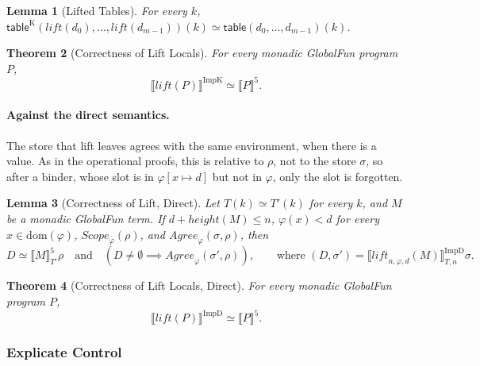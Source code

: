 \documentclass[10pt]{article}
\theoremstyle{acmplain}
\newtheorem{theorem}{Theorem}[section]
\newtheorem{lemma}[theorem]{Lemma}
\newcommand{\SEM}[1]{\llbracket #1 \rrbracket}
\newcommand{\key}[1]{\mathsf{#1}}
\newcommand{\pass}[1]{\mathit{#1}}
\newcommand{\NE}{\neq\emptyset}
\begin{document}
\begin{lemma}[Lifted Tables]\label{lem:lift-table}
For every $k$,
$\key{table}^{\mathrm{K}}(\pass{lift}(d_0), \ldots, \pass{lift}(d_{m-1}))(k) \simeq \key{table}(d_0, \ldots, d_{m-1})(k)$.
\end{lemma}

\begin{theorem}[Correctness of Lift Locals]\label{thm:lift}
For every monadic GlobalFun program $P$,
\[
  \SEM{\pass{lift}(P)}^{\mathrm{ImpK}} \simeq \SEM{P}^{\mathrm{5}} .
\]
\end{theorem}

\paragraph{Against the direct semantics.}
The store that lift leaves agrees with the same environment, when there
is a value. As in the operational proofs, this is relative to $\rho$,
not to the store $\sigma$, so after a binder, whose slot is in
$\varphi[x \mapsto d]$ but not in $\varphi$, only the slot is forgotten.

\begin{lemma}[Correctness of Lift, Direct]\label{lem:lift-sem-d}
Let $T(k) \simeq T'(k)$ for every $k$, and $M$ be a monadic GlobalFun term.
If $d + \mathit{height}(M) \leq n$, $\varphi(x) < d$ for every
$x \in \mathrm{dom}(\varphi)$, $\mathit{Scope}_{\varphi}(\rho)$, and
$\mathit{Agree}_{\varphi}(\sigma, \rho)$, then
\[
  D \simeq \SEM{M}^{\mathrm{5}}_{T'}\rho
  \quad\text{and}\quad
  (D \NE \implies \mathit{Agree}_{\varphi}(\sigma', \rho)),
  \qquad\text{where } (D, \sigma') = \SEM{\pass{lift}_{n,\varphi,d}(M)}^{\mathrm{ImpD}}_{T,n}\sigma .
\]
\end{lemma}

\begin{theorem}[Correctness of Lift Locals, Direct]\label{thm:lift-d}
For every monadic GlobalFun program $P$,
\[
  \SEM{\pass{lift}(P)}^{\mathrm{ImpD}} \simeq \SEM{P}^{\mathrm{5}} .
\]
\end{theorem}

\subsubsection{Explicate Control}\label{sec:den-explicate}
\end{document}

